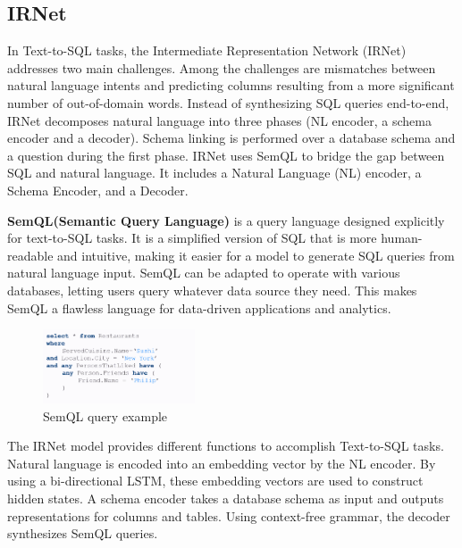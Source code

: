 \subsection{IRNet}


In Text-to-SQL tasks, the Intermediate Representation Network (IRNet)\cite{DBLP:journals/corr/abs-1905-08205} addresses two main challenges.
Among the challenges are mismatches between natural language intents and predicting columns resulting from a more significant number of out-of-domain words.
Instead of synthesizing SQL queries end-to-end, IRNet decomposes natural language into three phases (NL encoder, a schema encoder and a decoder).
Schema linking is performed over a database schema and a question during the first phase.
IRNet uses SemQL to bridge the gap between SQL and natural language.
It includes a Natural Language (NL) encoder, a Schema Encoder, and a Decoder.

\textbf{SemQL(Semantic Query Language)}\cite{semql}  is a query language designed explicitly for text-to-SQL tasks. It is a simplified version of SQL that is more human-readable and intuitive, making it easier for a model to generate SQL queries from natural language input. SemQL can be adapted to operate with various databases, letting users query whatever data source they need. This makes SemQL a flawless language for data-driven applications and analytics.

\begin{figure}[htb]
    \centering
    \includegraphics[width=0.4\textwidth]{pics/semql}
    \caption{SemQL query example\cite{2018MDM}}
    \label{fig:semql}
\end{figure}



The IRNet model provides different functions to accomplish Text-to-SQL tasks.
Natural language is encoded into an embedding vector by the NL encoder. By using a bi-directional LSTM, these embedding vectors are used to construct hidden states.
A schema encoder takes a database schema as input and outputs representations for columns and tables.
Using context-free grammar, the decoder synthesizes SemQL queries.

